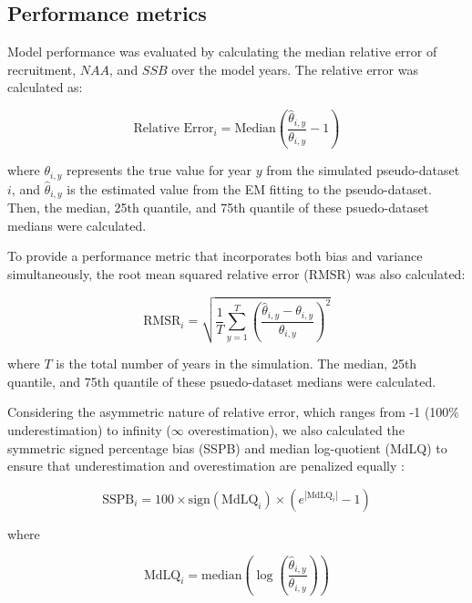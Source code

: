 \documentclass[
  12pt,
]{article}
\begin{document}
\hypertarget{performance-metrics}{%
\subsection{Performance metrics}\label{performance-metrics}}

Model performance was evaluated by calculating the median relative error
of recruitment, \(NAA\), and \(SSB\) over the model years. The relative
error was calculated as:

\begin{equation}
\text{Relative Error}_{i} = \text{Median} \left( \frac{\hat{\theta}_{i,y}}{\theta_{i,y}} - 1 \right)
\end{equation}

where \(\theta_{i,y}\) represents the true value for year \(y\) from the
simulated pseudo-dataset \(i\), and \(\hat{\theta}_{i,y}\) is the
estimated value from the EM fitting to the pseudo-dataset. Then, the
median, 25th quantile, and 75th quantile of these psuedo-dataset medians
were calculated.

To provide a performance metric that incorporates both bias and variance
simultaneously, the root mean squared relative error (RMSR) was also
calculated:

\begin{equation}
\text{RMSR}_{i} = \sqrt{ \frac{1}{T} \sum_{y=1}^{T} \left( \frac{\hat{\theta}_{i,y} - \theta_{i,y}}{\theta_{i,y}} \right)^2 }
\end{equation}

where \(T\) is the total number of years in the simulation. The median,
25th quantile, and 75th quantile of these psuedo-dataset medians were
calculated.

Considering the asymmetric nature of relative error, which ranges from
-1 (100\% underestimation) to infinity (\(\infty\) overestimation), we
also calculated the symmetric signed percentage bias (SSPB) and median
log-quotient (MdLQ) to ensure that underestimation and overestimation
are penalized equally \citep{Morley2018}:

\begin{equation}
\text{SSPB}_{i} = 100 \times \text{sign}(\text{MdLQ}_{i}) \times \left( e^{|\text{MdLQ}_{i}|} - 1 \right)
\end{equation}

where

\begin{equation}
\text{MdLQ}_{i} = \text{median}\left( \log \left( \frac{\hat{\theta}_{i,y}}{\theta_{i,y}} \right) \right)
\end{equation}
\end{document}
